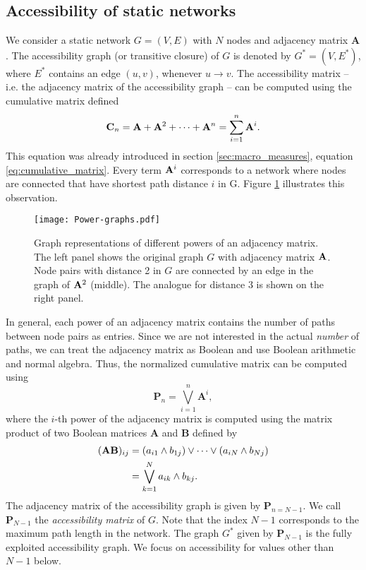 \subsection{Accessibility of static networks}\label{sec:unfolding_static}
We consider a static network $G=(V,E)$ with $N$ nodes and adjacency matrix $\mathbf{A}$.
The accessibility graph (or transitive closure) of $G$ is denoted by $G^*=(V,E^*)$, where $E^*$ contains an edge $(u,v)$, whenever $u\rightarrow v$.
The accessibility matrix -- i.e. the adjacency matrix of the accessibility graph -- can be computed using the cumulative matrix defined
\begin{equation*}%
\mat{C}_n=\mat{A}+\mat{A}^2+\cdots + \mat{A}^n = \sum _{i=1} ^n \mat{A}^i .
\end{equation*}
This equation was already introduced in section \ref{sec:macro_measures}, equation \eqref{eq:cumulative_matrix}.
Every term $\mathbf{A}^i$ corresponds to a network where nodes are connected that have shortest path distance $i$ in G.
Figure \ref{fig:power_graphs} illustrates this observation.
%
\begin{SCfigure}
\texttt{[image: Power-graphs.pdf]}
\caption{Graph representations of different powers of an adjacency matrix.
The left panel shows the original graph $G$ with adjacency matrix $\mathbf{A}$.
Node pairs with distance 2 in $G$ are connected by an edge in the graph of $\mathbf{A}^2$ (middle).
The analogue for distance 3 is shown on the right panel.}
\label{fig:power_graphs}
\end{SCfigure}

In general, each power of an adjacency matrix contains the number of paths between node pairs as entries.
Since we are not interested in the actual \emph{number} of paths, we can treat the adjacency matrix as Boolean and use Boolean arithmetic and normal algebra.
Thus, the normalized cumulative matrix can be computed using
\begin{equation}\label{eq:static_boolean_acc}
\mathbf{P}_{n}=\bigvee _{i=1} ^{n} \mathbf{A}^i ,
\end{equation}
where the $i$-th power of the adjacency matrix is computed using the matrix product of two Boolean matrices $\mathbf{A}$ and $\mathbf{B}$ defined by 
\begin{align}\label{eq:boolean_product}
(\mathbf{A}\mathbf{B})_{ij}&=(a_{i1}\wedge b_{1j})\vee \dots \vee(a_{iN}\wedge b_{Nj}) \nonumber \\
&= \bigvee _{k=1}^N a_{ik} \wedge b_{kj} .
\end{align}
The adjacency matrix of the accessibility graph is given by $\mathbf{P}_{n=N-1}$.
We call $\mathbf{P}_{N-1}$ the \emph{accessibility matrix} of $G$.
Note that the index $N-1$ corresponds to the maximum path length in the network.
The graph $G^*$ given by $\mathbf{P}_{N-1}$ is the fully exploited accessibility graph.
We focus on accessibility for values other than $N-1$ below.

